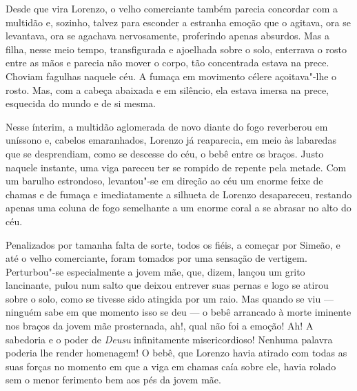 Desde que vira Lorenzo, o velho comerciante também parecia concordar com
a multidão e, sozinho, talvez para esconder a estranha emoção que o
agitava, ora se levantava, ora se agachava nervosamente, proferindo
apenas absurdos. Mas a filha, nesse meio tempo, transfigurada e
ajoelhada sobre o solo, enterrava o rosto entre as mãos e parecia não
mover o corpo, tão concentrada estava na prece. Choviam fagulhas
naquele céu. A fumaça em movimento célere açoitava"-lhe o rosto. Mas,
com a cabeça abaixada e em silêncio, ela estava imersa na prece,
esquecida do mundo e de si mesma.

Nesse ínterim, a multidão aglomerada de novo diante do fogo reverberou
em uníssono e, cabelos emaranhados, Lorenzo já reaparecia, em meio às
labaredas que se desprendiam, como se descesse do céu, o bebê entre
os braços. Justo naquele instante, uma viga pareceu ter se rompido de
repente pela metade. Com um barulho estrondoso, levantou"-se em direção
ao céu um enorme feixe de chamas e de fumaça e imediatamente a silhueta
de Lorenzo desapareceu, restando apenas uma coluna de fogo semelhante a
um enorme coral a se abrasar no alto do céu.

Penalizados por tamanha falta de sorte, todos os fiéis, a começar por
Simeão, e até o velho comerciante, foram tomados por uma sensação de
vertigem. Perturbou"-se especialmente a jovem mãe, que, dizem, lançou um
grito lancinante, pulou num salto que deixou entrever suas pernas e
logo se atirou sobre o solo, como se tivesse sido atingida por um raio.
Mas quando se viu --- ninguém sabe em que momento isso se deu --- o bebê
arrancado à morte iminente nos braços da jovem mãe prosternada, ah!,
qual não foi a emoção! Ah! A sabedoria e o poder de \textit{Deusu}
infinitamente misericordioso! Nenhuma palavra poderia lhe render
homenagem! O bebê, que Lorenzo havia atirado com todas as suas forças
no momento em que a viga em chamas caía sobre ele, havia rolado sem o
menor ferimento bem aos pés da jovem mãe.

